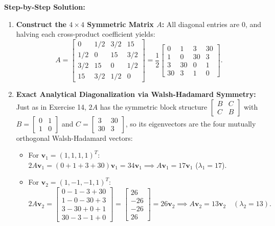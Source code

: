 \documentclass[11pt, letterpaper]{article}
\theoremstyle{definition}
\theoremstyle{remark}
\begin{document}
\textbf{Step-by-Step Solution:}
\begin{enumerate}[leftmargin=2em]
    \item \textbf{Construct the $4 \times 4$ Symmetric Matrix $A$:}
    All diagonal entries are $0$, and halving each cross-product coefficient yields:
    \[
    A = \begin{bmatrix}
    0 & 1/2 & 3/2 & 15 \\
    1/2 & 0 & 15 & 3/2 \\
    3/2 & 15 & 0 & 1/2 \\
    15 & 3/2 & 1/2 & 0
    \end{bmatrix} = \frac{1}{2}\begin{bmatrix}
    0 & 1 & 3 & 30 \\
    1 & 0 & 30 & 3 \\
    3 & 30 & 0 & 1 \\
    30 & 3 & 1 & 0
    \end{bmatrix}.
    \]
    \item \textbf{Exact Analytical Diagonalization via Walsh-Hadamard Symmetry:}
    Just as in Exercise 14, $2A$ has the symmetric block structure $\begin{bmatrix} B & C \\ C & B \end{bmatrix}$ with $B = \begin{bmatrix} 0 & 1 \\ 1 & 0 \end{bmatrix}$ and $C = \begin{bmatrix} 3 & 30 \\ 30 & 3 \end{bmatrix}$, so its eigenvectors are the four mutually orthogonal Walsh-Hadamard vectors:
    \begin{itemize}
        \item For $\mathbf{v}_1 = (1, 1, 1, 1)^T$: $2A\mathbf{v}_1 = (0+1+3+30)\mathbf{v}_1 = 34\mathbf{v}_1 \implies A\mathbf{v}_1 = 17\mathbf{v}_1$ ($\lambda_1 = 17$).
        \item For $\mathbf{v}_2 = (1, -1, -1, 1)^T$:
        \[
        2A\mathbf{v}_2 = \begin{bmatrix} 0 - 1 - 3 + 30 \\ 1 - 0 - 30 + 3 \\ 3 - 30 + 0 + 1 \\ 30 - 3 - 1 + 0 \end{bmatrix} = \begin{bmatrix} 26 \\ -26 \\ -26 \\ 26 \end{bmatrix} = 26\mathbf{v}_2 \implies A\mathbf{v}_2 = 13\mathbf{v}_2 \quad (\lambda_2 = 13).
\]
\end{itemize}
\end{enumerate}
\end{document}
